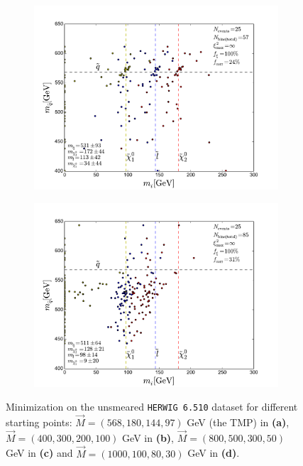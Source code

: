 \documentclass[twoside,english]{uiofysmaster}
\begin{document}
\begin{figure}[hbtp!]
	\begin{subfigure}[b]{0.45\textwidth}
		\includegraphics[width=\textwidth]{figures/webber_rec_table/webber-rec_wrong_starting_point-800-500-300-50_lowtol.pdf} 
		\caption{ }
	\end{subfigure}
	\begin{subfigure}[b]{0.45\textwidth}
		\includegraphics[width=\textwidth]{figures/webber_rec_table/webber-rec_wrong_starting_point-1000-100-80-30_lowtol.pdf}
		\caption{ } 
	\end{subfigure}
	\caption{Minimization on the unsmeared {\tt HERWIG 6.510} dataset for different starting points: $\vec M = (568, 180, 144, 97)$ GeV (the TMP) in {\bf (a)}, $\vec M = (400, 300, 200, 100)$ GeV  in {\bf (b)}, $\vec M = (800, 500, 300, 50)$ GeV in {\bf (c)} and $\vec M = (1000, 100, 80, 30)$ GeV in {\bf (d)}.}
	\label{fig:starting_point_sensitivity_combinatorics}
\end{figure}
\end{document}
